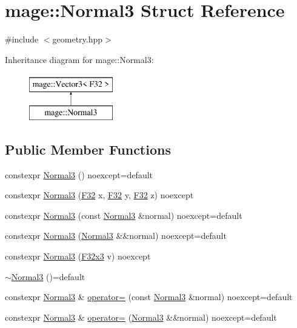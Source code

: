 \hypertarget{structmage_1_1_normal3}{}\section{mage\+:\+:Normal3 Struct Reference}
\label{structmage_1_1_normal3}


{\ttfamily \#include $<$geometry.\+hpp$>$}

Inheritance diagram for mage\+:\+:Normal3\+:\begin{figure}[H]
\begin{center}
\leavevmode
\includegraphics[height=2.000000cm]{structmage_1_1_normal3}
\end{center}
\end{figure}
\subsection*{Public Member Functions}
\begin{DoxyCompactItemize}
\item 
constexpr \hyperlink{structmage_1_1_normal3_a31cd202f6cda288c0b4702e232007b39}{Normal3} () noexcept=default
\item 
constexpr \hyperlink{structmage_1_1_normal3_a7ff657d4eea97a894d0ee7ad3cb02a16}{Normal3} (\hyperlink{namespacemage_aa97e833b45f06d60a0a9c4fc22ae02c0}{F32} x, \hyperlink{namespacemage_aa97e833b45f06d60a0a9c4fc22ae02c0}{F32} y, \hyperlink{namespacemage_aa97e833b45f06d60a0a9c4fc22ae02c0}{F32} z) noexcept
\item 
constexpr \hyperlink{structmage_1_1_normal3_ae85b31999c0f2b3f63fd854275a9ef85}{Normal3} (const \hyperlink{structmage_1_1_normal3}{Normal3} \&normal) noexcept=default
\item 
constexpr \hyperlink{structmage_1_1_normal3_a2f0bf2d017db9e1e7e214d3a9a849764}{Normal3} (\hyperlink{structmage_1_1_normal3}{Normal3} \&\&normal) noexcept=default
\item 
constexpr \hyperlink{structmage_1_1_normal3_aefed0af318bd76295b614153e75c3846}{Normal3} (\hyperlink{namespacemage_a73fbe0da4b8d5bc156bb8453e5b63a17}{F32x3} v) noexcept
\item 
\hyperlink{structmage_1_1_normal3_a3384b2970fd85fe729514ce0686b4446}{$\sim$\+Normal3} ()=default
\item 
constexpr \hyperlink{structmage_1_1_normal3}{Normal3} \& \hyperlink{structmage_1_1_normal3_aeeb43d61c914bc975c22e059b8bbeec9}{operator=} (const \hyperlink{structmage_1_1_normal3}{Normal3} \&normal) noexcept=default
\item 
constexpr \hyperlink{structmage_1_1_normal3}{Normal3} \& \hyperlink{structmage_1_1_normal3_a59aca1c2a1eb936c36bce64b4b5936b9}{operator=} (\hyperlink{structmage_1_1_normal3}{Normal3} \&\&normal) noexcept=default
\end{DoxyCompactItemize}


